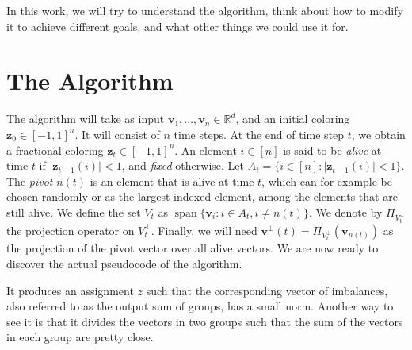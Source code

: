 \documentclass[12pt]{article}
\DeclareMathOperator{\Span}{span}
\begin{document}
In this work, we will try to understand the algorithm, think about how to modify it to achieve different goals, and what other things we could use it for.

\section{The Algorithm}
The algorithm will take as input $\textbf{v}_1,\ldots,\textbf{v}_n\in\mathbb{R}^d$, and an initial coloring $\textbf{z}_0\in[-1,1]^n$. It will consist of $n$ time steps. At the end of time step $t$, we obtain a fractional coloring $\textbf{z}_t\in[-1,1]^n$. An element $i \in [n]$ is said to be \textit{alive} at time $t$ if $|\textbf{z}_{t-1}(i)|<1$, and \textit{fixed} otherwise. Let $A_t=\{i\in[n]:|\textbf{z}_{t-1}(i)|<1\}$. The \textit{pivot} $n(t)$ is an element that is alive at time $t$, which can for example be chosen randomly or as the largest indexed element, among the elements that are still alive. We define the set $V_t$ as $\Span\{\textbf{v}_i:i\in A_t,i\not=n(t)\}$. We denote by $\Pi_{V_t^\perp}$ the projection operator on $V_t^\perp$. Finally, we will need $\textbf{v}^{\perp}(t)=\Pi_{V_t^\perp}(\textbf{v}_{n(t)})$ as the projection of the pivot vector over all alive vectors. We are now ready to discover the actual pseudocode of the algorithm.

It produces an assignment $z$ such that the corresponding vector of imbalances, also referred to as the output sum of groups, has a small norm. Another way to see it is that it divides the vectors in two groups such that the sum of the vectors in each group are pretty close.
\end{document}
